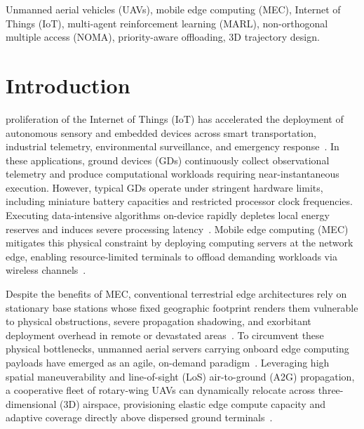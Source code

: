 \documentclass[journal]{IEEEtran}
\begin{document}
\begin{IEEEkeywords}
Unmanned aerial vehicles (UAVs), mobile edge computing (MEC), Internet of Things (IoT), multi-agent reinforcement learning (MARL), non-orthogonal multiple access (NOMA), priority-aware offloading, 3D trajectory design.
\end{IEEEkeywords}

\section{Introduction}

 proliferation of the Internet of Things (IoT) has accelerated the deployment of autonomous sensory and embedded devices across smart transportation, industrial telemetry, environmental surveillance, and emergency response~\cite{liu2025integrated, mao2017mec}. In these applications, ground devices (GDs) continuously collect observational telemetry and produce computational workloads requiring near-instantaneous execution. However, typical GDs operate under stringent hardware limits, including miniature battery capacities and restricted processor clock frequencies. Executing data-intensive algorithms on-device rapidly depletes local energy reserves and induces severe processing latency~\cite{zhan2026joint, barman2025joint}. Mobile edge computing (MEC) mitigates this physical constraint by deploying computing servers at the network edge, enabling resource-limited terminals to offload demanding workloads via wireless channels~\cite{mao2017mec, 11020655}.

Despite the benefits of MEC, conventional terrestrial edge architectures rely on stationary base stations whose fixed geographic footprint renders them vulnerable to physical obstructions, severe propagation shadowing, and exorbitant deployment overhead in remote or devastated areas~\cite{li2026tnse, zeng2019accessing}. To circumvent these physical bottlenecks, unmanned aerial servers carrying onboard edge computing payloads have emerged as an agile, on-demand paradigm~\cite{kang2023cooperative, tariq2024toward}. Leveraging high spatial maneuverability and line-of-sight (LoS) air-to-ground (A2G) propagation, a cooperative fleet of rotary-wing UAVs can dynamically relocate across three-dimensional (3D) airspace, provisioning elastic edge compute capacity and adaptive coverage directly above dispersed ground terminals~\cite{11500527, li2026tnse}.
\end{document}
